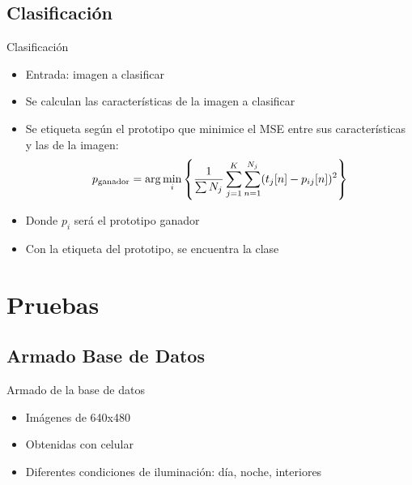 \documentclass[spanish]{beamer}
\begin{document}
\subsection{Clasificación}
\begin{frame}{Clasificación}
  \begin{itemize}
  \item Entrada: imagen a clasificar
  \item Se calculan las características de la imagen a clasificar
  \item Se etiqueta según el prototipo que minimice el MSE entre sus
    características y las de la imagen:
\begin{equation}
  p_{\textrm{ganador}}=\arg \min_i\left\{ \frac{1}{\sum N_j}
                \sum_{j=1}^K\sum_{n=1}^{N_j}(t_j[n]-p_{ij}[n])^2\right\}
\end{equation}
\item Donde $p_i$ será el prototipo ganador
\item Con la etiqueta del prototipo, se encuentra la clase
  \end{itemize}
\end{frame}
%
\section{Pruebas}
%
\subsection{Armado Base de Datos}
\begin{frame}{Armado de la base de datos}
  \begin{itemize}
  \item Imágenes de 640x480
  \item Obtenidas con celular
  \item Diferentes condiciones de iluminación: día, noche, interiores
  \end{itemize}
\end{frame}
%
\end{document}
